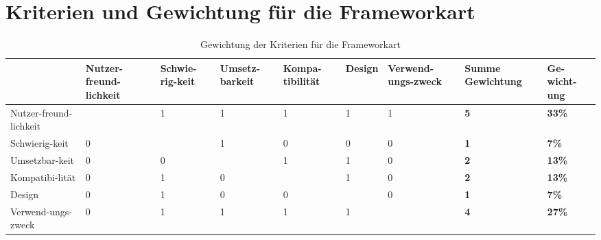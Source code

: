 \documentclass[a4paper,titlepage,halfparskip,12pt]{scrreprt}
\begin{document}
\section{Kriterien und Gewichtung für die Frameworkart}
\begin{table}[h]
	\renewcommand{\arraystretch}{2}
	\centering
	\caption{Gewichtung der Kriterien für die Frameworkart}
	\begin{adjustbox}{angle=90}
		\begin{tabular}{p{2cm}|p{1,5cm}|p{}|p{}|p{}|p{}|p{1,8cm}|p{}|p{}}
			& Nutzer-freund-lichkeit & Schwie-rig-keit & Umsetz-barkeit & Kompa-tibilität & Design& Verwend-ungs-zweck & \textbf{Summe Gewichtung} & \textbf{Ge-wicht-ung}  \\
			\hline
			Nutzer-freund-lichkeit & \cellcolor{gray} & 1 &1&1&1&1&\textbf{5}& \textbf{33\%}  \\
			\hline
			Schwierig-keit & 0 & \cellcolor{gray} &1&0&0&0&\textbf{1}& \textbf{7\%}  \\
			\hline
			Umsetzbar-keit  &0&0&\cellcolor{gray}&1&1&0&\textbf{2}& \textbf{13\%} \\
			\hline
			Kompatibi-lität & 0 & 1 &0&\cellcolor{gray}&1&0&\textbf{2}& \textbf{13\%}  \\
			\hline
			Design & 0 &  1 &0&0&\cellcolor{gray}&0&\textbf{1}& \textbf{7\%} \\
			\hline 
			Verwend-ungs-zweck & 0 & 1 &1&1&1&\cellcolor{gray}&\textbf{4}& \textbf{27\%}  \\
			\hline
		\end{tabular}
		\label{tab:GewichtungFrameworkart}
	\end{adjustbox}
\end{table}
\end{document}
